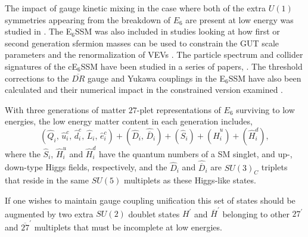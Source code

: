 \documentclass[preprint,amsmath,amssymb,aps,superscriptaddress,prd,
showpacs,floatfix,nofootinbib]{revtex4-1}
\newcommand{\be}{\begin{equation}}
\newcommand{\ee}{\end{equation}}
\begin{document}
The impact of gauge kinetic mixing in the case where both of the extra
$U(1)$ symmetries appearing from the breakdown of $E_6$ are present at
low energy was studied in \cite{Rizzo:2012rf}.  The E$_6$SSM was also
included in studies looking at how first or second generation sfermion
masses can be used to constrain the GUT scale parameters \cite{Miller:2012vn}
and the renormalization of VEVs \cite{Sperling:2013eva, Sperling:2013xqa}.
The particle spectrum and collider signatures of the cE$_6$SSM have been
studied in a series of papers, \cite{Athron:2009ue, Athron:2009bs,
Athron:2011wu,Athron:2012sq}.  The threshold corrections to the
$\overline{DR}$ gauge and Yukawa couplings in the E$_6$SSM have also been
calculated and their numerical impact in the constrained version examined
\cite{Athron:2012pw}.

With three generations of matter $27$-plet representations of $E_6$
surviving to low energies, the low energy matter content in each generation
includes, \be
(\hat{Q}_i, \, \hat{u}^c_i, \, \hat{d}^c_i, \, \hat{L}_i, \, \hat{e}^c_i)
+ (\hat{D}_i, \, \hat{\overline{D}}_i) + (\hat{S}_{i}) + (\hat{H}^u_i)
+ (\hat{H}^d_i) ,\ee
where the $\hat{S}_{i}$, $\hat{H}^u_i$ and $\hat{H}^d_i$ have the quantum
numbers of a SM singlet, and up-, down-type Higgs fields, respectively, and
the $\hat{D}_i$ and $\hat{\overline{D}}_i$ are $SU(3)_C$ triplets that reside
in the same $SU(5)$ multiplets as these Higgs-like states.

If one wishes to maintain gauge coupling unification this set of states should
be augmented by two extra $SU(2)$ doublet states $H^\prime$ and
$\overline{H}^\prime$ belonging to other $27^\prime$ and $\overline{27}^\prime$
multiplets that must be incomplete at low energies.
\end{document}
